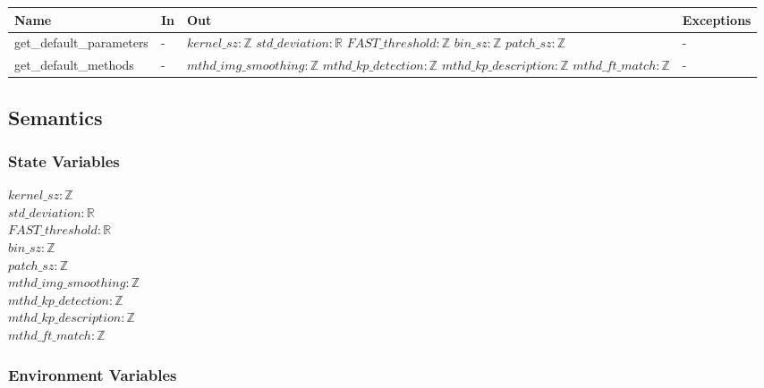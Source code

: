 \documentclass[12pt, titlepage]{article}
\begin{document}
\begin{center}
\begin{tabular}{p{4cm} p{3.5cm} p{4cm} p{3.5cm}}
\hline
\textbf{Name} & \textbf{In} & \textbf{Out} & \textbf{Exceptions} \\
\hline
get\_default\_parameters & - & 
$kernel\_sz: \mathbb{Z}$ \newline 
$std\_deviation: \mathbb{R}$ \newline 
$FAST\_threshold: \mathbb{Z}$ \newline 
$bin\_sz: \mathbb{Z}$ \newline 
$patch\_sz: \mathbb{Z}$ 
& - \\
\hline
get\_default\_methods & - & 
$mthd\_img\_smoothing:\mathbb{Z}$ \newline 
$mthd\_kp\_detection:\mathbb{Z}$ \newline 
$mthd\_kp\_description:\mathbb{Z}$ \newline 
$mthd\_ft\_match:\mathbb{Z}$ & - \\
\hline
\end{tabular}
\end{center}

\subsection{Semantics}

\subsubsection{State Variables}

$kernel\_sz: \mathbb{Z}$ \\
$std\_deviation: \mathbb{R}$ \\
$FAST\_threshold: \mathbb{R}$ \\
$bin\_sz: \mathbb{Z}$ \\
$patch\_sz: \mathbb{Z}$ \\
$mthd\_img\_smoothing: \mathbb{Z}$ \\
$mthd\_kp\_detection: \mathbb{Z}$ \\
$mthd\_kp\_description: \mathbb{Z}$ \\
$mthd\_ft\_match: \mathbb{Z}$ \\

\subsubsection{Environment Variables}

\end{document}
